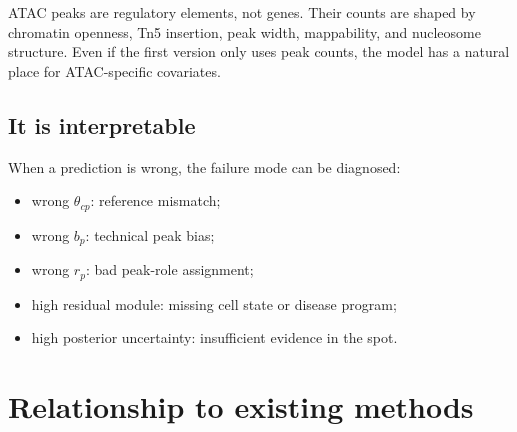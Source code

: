 \documentclass[11pt]{article}
\begin{document}
ATAC peaks are regulatory elements, not genes. Their counts are shaped by chromatin openness, Tn5 insertion, peak width, mappability, and nucleosome structure. Even if the first version only uses peak counts, the model has a natural place for ATAC-specific covariates.

\subsection{It is interpretable}

When a prediction is wrong, the failure mode can be diagnosed:
\begin{itemize}
    \item wrong $\theta_{cp}$: reference mismatch;
    \item wrong $b_p$: technical peak bias;
    \item wrong $r_p$: bad peak-role assignment;
    \item high residual module: missing cell state or disease program;
    \item high posterior uncertainty: insufficient evidence in the spot.
\end{itemize}

\section{Relationship to existing methods}
\end{document}
